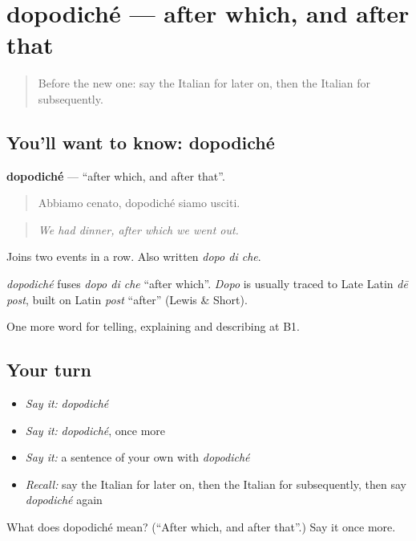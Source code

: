 \section[dopodiché]{dopodiché — after which, and after that}

\label{lesson:IT-C273-dopodiche}



\begin{quote}
Before the new one: say the Italian for later on, then the Italian for subsequently.
\end{quote}

\subsection*{You'll want to know: dopodiché}
\textbf{dopodiché} — \textquotedblleft{}after which, and after that\textquotedblright{}.

\begin{quote}
Abbiamo cenato, dopodiché siamo usciti.
\end{quote}

\begin{quote}
\emph{We had dinner, after which we went out.}
\end{quote}

Joins two events in a row. Also written \emph{dopo di che}.

\begin{cousinweb}
\emph{dopodiché} fuses \emph{dopo di che} \textquotedblleft{}after which\textquotedblright{}. \emph{Dopo} is usually traced to Late Latin \emph{dē post}, built on Latin \emph{post} \textquotedblleft{}after\textquotedblright{} (Lewis \& Short).
\end{cousinweb}

\begin{grammarlens}[title={What you've built}]
One more word for telling, explaining and describing at B1.
\end{grammarlens}

\subsection*{Your turn}
\begin{itemize}
\raggedright
  \item \emph{Say it:} \emph{dopodiché}
  \item \emph{Say it:} \emph{dopodiché}, once more
  \item \emph{Say it:} a sentence of your own with \emph{dopodiché}
  \item \emph{Recall:} say the Italian for later on, then the Italian for subsequently, then say \emph{dopodiché} again
\end{itemize}

\begin{tcolorbox}[breakable,colback=teal!4,colframe=teal!35!black,title={Before you move on}]
What does dopodiché mean? (\textquotedblleft{}After which, and after that\textquotedblright{}.) Say it once more.
\end{tcolorbox}
